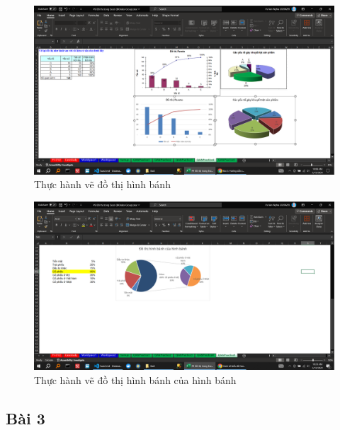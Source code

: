 \documentclass{article}
\begin{document}
\begin{figure}[H]
    \centering
    \includegraphics[scale = 0.15]{Bai2/ThucHanh/2.png}
    \caption{Thực hành vẽ đồ thị hình bánh}
\end{figure}

\begin{figure}[H]
    \centering
    \includegraphics[scale = 0.15]{Bai2/ThucHanh/3.png}
    \caption{Thực hành vẽ đồ thị hình bánh của hình bánh}
\end{figure}





\subsection{Bài 3}

\end{document}
